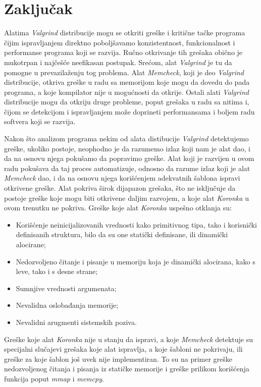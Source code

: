 \documentclass[12pt,oneside]{memoir}
\theoremstyle{plain}
\theoremstyle{definition}
\begin{document}

\chapter{Zaključak}
Alatima \textit{Valgrind} distribucije mogu se otkriti greške i kritične tačke programa čijim ispravljanjem direktno poboljšavamo konzistentnost, funkcionalnost i performanse programa koji se razvija. Ručno otkrivanje tih grešaka obično je mukotrpan i najčešće neefikasan postupak. Srećom, alat \textit{Valgrind} je tu da pomogne u prevazilaženju tog problema. Alat \textit{Memcheck}, koji je deo \textit{Valgrind} distribucije, otkriva greške u radu sa memorijom koje mogu da dovedu do pada programa, a koje kompilator nije u mogućnosti da otkrije. Ostali alati \textit{Valgrind} distribucije mogu da otkriju druge probleme, poput grešaka u radu sa nitima i, čijom se detekcijom i ispravljanjem može doprineti performansama i boljem radu softvera koji se razvija. 

Nakon što analizom programa nekim od alata distibucije \textit{Valgrind} detektujemo greške, ukoliko postoje, neophodno je da razumemo izlaz koji nam je alat dao, i da na osnovu njega pokušamo da popravimo greške. Alat koji je razvijen u ovom radu pokušava da taj proces automatizuje, odnosno da razume izlaz koji je alat \textit{Memcheck} dao, i da na osnovu njega korišćenjem adekvatnih šablona ispravi otkrivene greške. Alat pokriva širok dijapazon grešaka, što ne isključuje da postoje greške koje mogu biti otkrivene daljim razvojem, a koje alat \textit{Koronka} u ovom trenutku ne pokriva. Greške koje alat \textit{Koronka} uspešno otklanja su:
\begin{itemize}
\item Korišćenje neinicijalizovanih vrednosti kako primitivnog tipa, tako i korisnički definisanih struktura, bilo da su one statički definisane, ili dinamički alocirane;
\item Nedozvoljeno čitanje i pisanje u memoriju koja je dinamički alocirana, kako s leve, tako i s desne strane;
\item Sumnjive vrednosti argumenata;
\item Nevalidna oslobađanja memorije;
\item Nevalidni arugmenti sistemskih poziva.
\end{itemize}
Greške koje alat \textit{Koronka} nije u stanju da ispravi, a koje \textit{Memcheck} detektuje su specijalni slučajevi grešaka koje alat ispravlja, a koje šabloni ne pokrivaju, ili greške za koje šablon još uvek nije implementiran.
To su na primer greške nedozvoljenog čitanja i pisanja iz statičke memorije i greške prilikom korišćenja funkcija poput \textit{mmap} i \textit{memcpy}.
\end{document}
